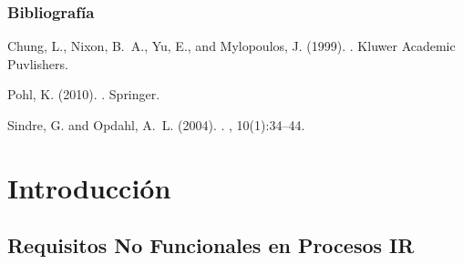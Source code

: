 \documentclass[handout,a4paper,slidestop,xcolor=pst,dvips,blue]{beamer}
\begin{document}
\begin{frame}[t]
    \frametitle{Bibliografía}
    \begin{thebibliography}{}
        Chung, L., Nixon, B.~A., Yu, E., and Mylopoulos, J. (1999).
        .
        \newblock Kluwer Academic Puvlishers.

        Pohl, K. (2010).
        .
        \newblock Springer.

        Sindre, G. and Opdahl, A.~L. (2004).
        .
        , 10(1):34--44.

    \end{thebibliography}
\end{frame}

\section{Introducción}

\subsection{Requisitos No Funcionales en Procesos IR}
\end{document}
